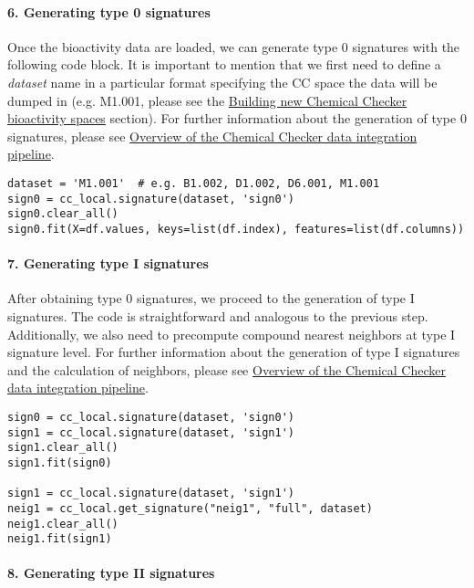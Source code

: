 \paragraph{6. Generating type 0 signatures} \leavevmode

Once the bioactivity data are loaded, we can generate type 0 signatures with the following code block. It is important to mention that we first need to define a \textit{dataset} name in a particular format specifying the CC space the data will be dumped in (e.g. M1.001, please see the \hyperref[Building_NEW_CC_BIOACTIVITY_SPACES]{Building new Chemical Checker bioactivity spaces} section). For further information about the generation of type 0 signatures, please see \hyperref[Overview of the Chemical Checker data integration pipeline]{Overview of the Chemical Checker data integration pipeline}. \\

\begin{lstlisting}
dataset = 'M1.001'  # e.g. B1.002, D1.002, D6.001, M1.001
sign0 = cc_local.signature(dataset, 'sign0')
sign0.clear_all()
sign0.fit(X=df.values, keys=list(df.index), features=list(df.columns))
\end{lstlisting}


\paragraph{7. Generating type I signatures} \leavevmode

After obtaining type 0 signatures, we proceed to the generation of type I signatures. The code is straightforward and analogous to the previous step. Additionally, we also need to precompute compound nearest neighbors at type I signature level. For further information about the generation of type I signatures and the calculation of neighbors, please see \hyperref[Overview of the Chemical Checker data integration pipeline]{Overview of the Chemical Checker data integration pipeline}. \\

\begin{lstlisting}
sign0 = cc_local.signature(dataset, 'sign0')
sign1 = cc_local.signature(dataset, 'sign1')
sign1.clear_all()
sign1.fit(sign0)

sign1 = cc_local.signature(dataset, 'sign1')
neig1 = cc_local.get_signature("neig1", "full", dataset)
neig1.clear_all()
neig1.fit(sign1)
\end{lstlisting}

\paragraph{8. Generating type II signatures} \leavevmode

